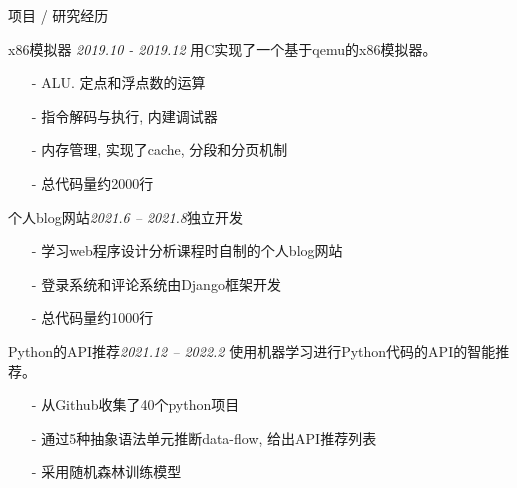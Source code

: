 \documentclass{resume} %
\begin{document}
\begin{rSection}{项目 / 研究经历}

\begin{rSubsection}{x86模拟器} {\em 2019.10 - 2019.12}
{用C实现了一个基于qemu的x86模拟器。\\}
\item
\begin{itemize}
\setlength\itemsep{-0.5em}
\item[-] ALU. 定点和浮点数的运算
\item[-] 指令解码与执行, 内建调试器
\item[-] 内存管理, 实现了cache, 分段和分页机制
\item[-] 总代码量约2000行
\end{itemize}
\end{rSubsection}


\begin{rSubsection}{个人blog网站}{\em 2021.6 – 2021.8}{独立开发 \\}
{}
\item[]
\begin{itemize}
\setlength\itemsep{-0.5em}
\item[-] 学习web程序设计分析课程时自制的个人blog网站
\item[-] 登录系统和评论系统由Django框架开发
\item[-] 总代码量约1000行
\end{itemize}
\end{rSubsection}

\begin{rSubsection}{Python的API推荐}{\em 2021.12 – 2022.2}
{使用机器学习进行Python代码的API的智能推荐。\\} { }
\item[]
\begin{itemize}
\setlength\itemsep{-0.5em}
\item[-] 从Github收集了40个python项目
\item[-] 通过5种抽象语法单元推断data-flow, 给出API推荐列表
\item[-] 采用随机森林训练模型
\end{itemize}
\end{rSubsection}

\end{rSection}

\end{document}
